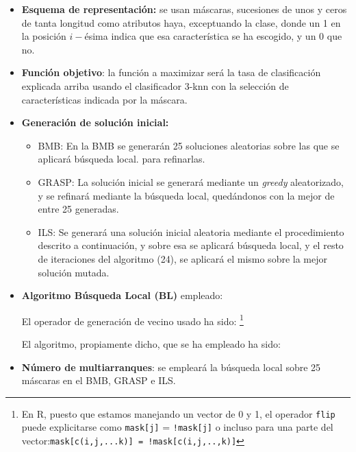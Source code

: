 \documentclass[a4paper,11pt]{article}
\begin{document}
\begin{itemize} 
\item \textbf{Esquema de representación:} se usan máscaras, sucesiones de unos y ceros de tanta longitud como atributos haya,
exceptuando la clase, donde un 1 en la posición $i-$ésima indica que esa característica se ha escogido, y un $0$ que no.

\item \textbf{Función objetivo}: la función a maximizar será la tasa de clasificación explicada arriba usando el clasificador
3-knn con la selección de características indicada por la máscara.\\

\small\texttt{}
\normalsize

\item \textbf{Generación de solución inicial: }
  \begin{itemize}
   \item BMB: En la BMB se generarán 25 soluciones aleatorias sobre las que se aplicará búsqueda local.
   para refinarlas.\\
   
   \small\texttt{}
   \normalsize
   
   \item GRASP: La solución inicial se generará mediante un \textit{greedy} aleatorizado, y se refinará mediante
   la búsqueda local, quedándonos con la mejor de entre 25 generadas.\\
   
   \small\texttt{}
   \normalsize
   
   \item ILS: Se generará una solución inicial aleatoria mediante el procedimiento descrito a continuación, y sobre esa se
   aplicará búsqueda local, y el resto de iteraciones del algoritmo (24), se aplicará el mismo sobre la mejor solución
   mutada.\\
   
   \small\texttt{}
   \normalsize
    
  \end{itemize}


\item \textbf{Algoritmo Búsqueda Local (BL)} empleado:
  
  El operador de generación de vecino usado ha sido:
  \footnote{En R, puesto que estamos manejando un vector de 0 y 1, el operador \texttt{flip} puede explicitarse como
  \texttt{mask[j]} = \texttt{!mask[j]} o incluso para una parte del vector:\quad \texttt{mask[c(i,j,...k)] = !mask[c(i,j,..,k)]}}\\
  
  \small\texttt{}
  \normalsize
  
  
  El algoritmo, propiamente dicho, que se ha empleado ha sido:\\
  
  \small\texttt{}

\item \textbf{Número de multiarranques}: se empleará la búsqueda local sobre 25 máscaras en el BMB, GRASP e ILS.

\end{itemize}
\end{document}
